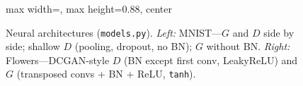 \begin{figure}[t]
\begin{adjustbox}{max width=\textwidth, max height=0.88\textheight, center}
\begin{minipage}[t]{0.48\textwidth}
\begin{minipage}[t]{0.49\linewidth}
\end{minipage}
\end{minipage}
\end{adjustbox}
\vskip 0.08in
\caption{Neural architectures (\texttt{models.py}). \emph{Left:} MNIST---$G$ and $D$ side by side; shallow $D$ (pooling, dropout, no BN); $G$ without BN. \emph{Right:} Flowers---DCGAN-style $D$ (BN except first conv, LeakyReLU) and $G$ (transposed convs + BN + ReLU, \texttt{tanh}).}
\label{fig:gan-arch}
\vskip -0.1in
\end{figure}
